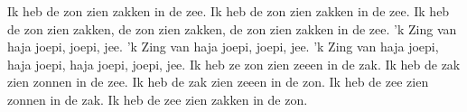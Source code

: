 \beginverse
Ik heb de zon zien zakken in de zee.
Ik heb de zon zien zakken in de zee.
Ik heb de zon zien zakken, de zon zien zakken,
de zon zien zakken in de zee.
\endverse
\beginchorus
'k Zing van haja joepi, joepi, jee.
'k Zing van haja joepi, joepi, jee.
'k Zing van haja joepi, haja joepi,
haja joepi, joepi, jee.
\endchorus
\beginverse
Ik heb ze zon zien zeeen in de zak.
\endverse
\beginverse
Ik heb de zak zien zonnen in de zee.
\endverse
\beginverse
Ik heb de zak zien zeeen in de zon.
\endverse
\beginverse
Ik heb de zee zien zonnen in de zak.
\endverse
\beginverse
Ik heb de zee zien zakken in de zon.
\endverse
\endsong